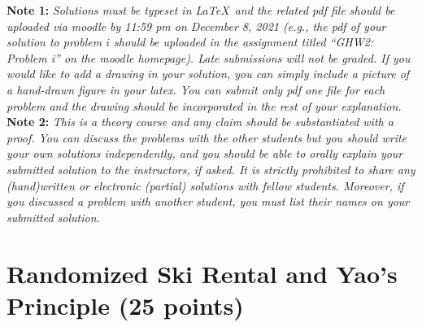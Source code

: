 \documentclass[11pt]{article}
\begin{document}

\newcommand{\hint}[1]{\begin{flushright}\reflectbox{\textit{#1}}\end{flushright}}



\noindent\textbf{Note 1:} \emph{Solutions must be typeset in \LaTeX\ and the related pdf file should be uploaded via moodle by 11:59 pm on December 8, 2021 (e.g., the pdf of your solution to problem $i$ should be uploaded in the assignment titled ``GHW2: Problem i'' on the moodle homepage). Late submissions will not be graded. If you would like to add a drawing in your solution, you can simply include a picture of a hand-drawn figure in your latex. You can submit only pdf one file for each problem and the drawing should be incorporated in the rest of your explanation. }
\\  

\noindent\textbf{Note 2:} \emph{This is a theory course and any claim should be substantiated with a proof. You can discuss the problems with the other students but you should write your own solutions independently, and you should be able to orally explain your submitted solution to the instructors, if asked. It is strictly prohibited to share any (hand)written or electronic (partial) solutions with
fellow students. Moreover, if you discussed a problem with another student, you must list their names on your submitted solution. }\\


\section{Randomized Ski Rental and Yao's Principle (25 points)}
\end{document}

